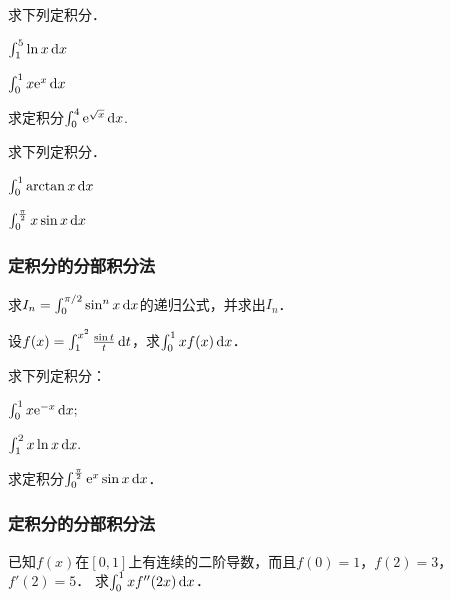 \documentclass[14pt,notheorems,leqno,xcolor={rgb}]{beamer} %
\begin{document}
\begin{frame}
\begin{example}求下列定积分．
\begin{enumlite}
  \item $\int_1^5 \ln x \mathop{}\!\mathrm{d} x$
  \item $\int_0^1 x\mathrm{e}^x \mathop{}\!\mathrm{d} x$
\end{enumlite}
\end{example}
\vpause
\begin{example}
求定积分$\int_0^4 \mathrm{e}^{\sqrt{x}} \mathop{}\!\mathrm{d} x$.
\end{example}
\end{frame}

\begin{frame}
\begin{exercise}求下列定积分．
\begin{enumlite}
  \item $\int_0^1 \arctan x \mathop{}\!\mathrm{d} x$
  \item $\int_0^{\frac{\pi}2} x\sin x \mathop{}\!\mathrm{d} x$
\end{enumlite}
\end{exercise}
\end{frame}

\begin{iframe}
\frametitle{定积分的分部积分法}
\begin{example}
求$I_n=\int_0^{\pi/2}\sin^{n}x\mathop{}\!\mathrm{d}{x}$的递归公式，并求出$I_n$．
\end{example}
\vpause
\begin{example}
设$f(x)=\int_1^{x^2}\frac{\sin t}{t}\mathop{}\!\mathrm{d} t$，求$\int_0^1 xf(x)\mathop{}\!\mathrm{d} x$．
\end{example}
\end{iframe}


\begin{frame}
\begin{review}
求下列定积分：
\begin{enumlite}
  \item $\int_0^1 x\mathrm{e}^{-x} \mathop{}\!\mathrm{d} x;$
  \item $\int_1^2 x\ln x \mathop{}\!\mathrm{d} x.$
\end{enumlite}
\end{review}
\pause
\begin{review}
求定积分$\int_0^{\frac{\pi}2}\mathrm{e}^x\sin x \mathop{}\!\mathrm{d} x$．
\end{review}
\end{frame}

\begin{iframe}
\frametitle{定积分的分部积分法}
\begin{example}
已知$f(x)$在$[0,1]$上有连续的二阶导数，而且$f(0)=1$，$f(2)=3$，$f'(2)=5$．
求$\int_0^1 xf''(2x)\mathop{}\!\mathrm{d} x$．
\end{example}
\end{iframe}
\end{document}

